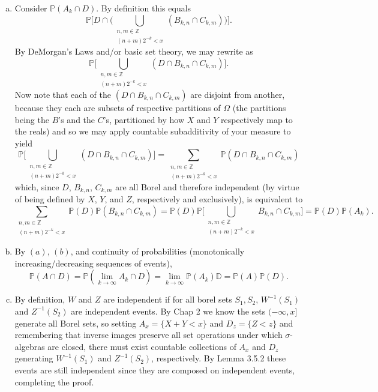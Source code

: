 \documentclass{article}
\begin{document}
\begin{enumerate}[(a)]
\item Consider $\mathbb{P}(A_k \cap D)$. By definition this equals  \[\mathbb{P}\Bigg[ D \cap \Big( \bigcup_{\substack{n,m \in \mathbb{Z} \\ (n+m)2^{-k} < x}} (B_{k,n} \cap C_{k,m}) \Big) \Bigg].\] By DeMorgan's Laws and/or basic set theory, we may rewrite as \[\mathbb{P}\Bigg[ \bigcup_{\substack{n,m \in \mathbb{Z} \\ (n+m)2^{-k} < x}} (D \cap B_{k,n} \cap C_{k,m}) \Bigg].\] Now note that each of the $(D \cap B_{k,n} \cap C_{k,m})$ are disjoint from another, because they each are subsets of respective partitions of $\Omega$ (the partitions being the $B$'s and the $C$'s, partitioned by how $X$ and $Y$ respectively map to the reals) and so we may apply countable subadditivity of your measure to yield  \[\mathbb{P}\Bigg[ \bigcup_{\substack{n,m \in \mathbb{Z} \\ (n+m)2^{-k} < x}} (D \cap B_{k,n} \cap C_{k,m}) \Bigg] = \sum_{\substack{n,m \in \mathbb{Z} \\ (n+m)2^{-k} < x}} \mathbb{P}(D \cap B_{k,n} \cap C_{k,m})\] which, since $D$, $B_{k,n}$, $C_{k,m}$ are all Borel and therefore independent (by virtue of being defined by $X$, $Y$, and $Z$, respectively and exclusively), is equivalent to \[\sum_{\substack{n,m \in \mathbb{Z} \\ (n+m)2^{-k} < x}} \mathbb{P}(D) \mathbb{P}(B_{k,n} \cap C_{k,m}) = \mathbb{P}(D) \mathbb{P} \Big[\bigcup_{\substack{n,m \in \mathbb{Z} \\ (n+m)2^{-k} < x}} B_{k,n} \cap C_{k,m} \Big] = \mathbb{P}(D) \mathbb{P}(A_k).\]

\item By $(a)$, $(b)$, and continuity of probabilities (monotonically increasing/decreasing sequences of events), \[\mathbb{P}(A \cap D) = \mathbb{P}(\lim_{k \to \infty} A_k \cap D) = \lim_{k \to \infty} \mathbb{P}(A_k) \mathbb{D} = \mathbb{P}(A) \mathbb{P}(D). \]

\item By definition, $W$ and $Z$ are independent if for all borel sets $S_1, S_2$, $W^{-1}(S_1)$ and $Z^{-1}(S_2)$ are independent events. By Chap 2 we know the sets $(-\infty, x]$ generate all Borel sets, so setting $A_x = \{X + Y < x\}$ and $D_z = \{Z < z\}$ and remembering that inverse images preserve all set operations under which $\sigma$-algebras are closed, there must exist countable collections of $A_x$ and $D_z$ generating $W^{-1}(S_1)$ and $Z^{-1}(S_2)$, respectively. By Lemma 3.5.2 these events are still independent since they are composed on independent events, completing the proof. 

\end{enumerate}
\end{document}
